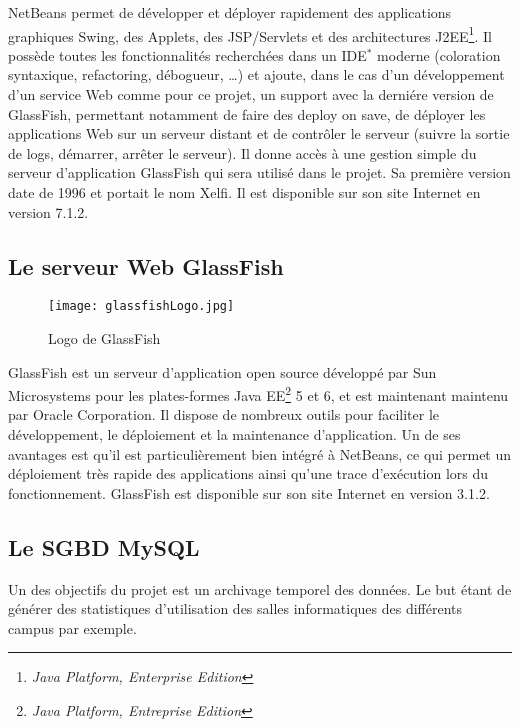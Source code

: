 NetBeans permet de d\'evelopper et d\'eployer rapidement des applications graphiques Swing, des Applets, des JSP/Servlets et des architectures J2EE\protect\footnote{\textit{Java Platform, Enterprise Edition}}.
Il poss\`ede toutes les fonctionnalit\'es recherch\'ees dans un IDE$^*$ moderne (coloration syntaxique, refactoring, d\'ebogueur, \ldots) et ajoute, dans le cas d'un d\'eveloppement d'un service Web comme pour ce projet, un support avec la derni\'ere version de GlassFish, permettant notamment de faire des \og{}deploy on save\fg{}, de d\'eployer les applications Web sur un serveur distant et de contr\^oler le serveur (suivre la sortie de logs, d\'emarrer, arr\^eter le serveur). 
Il donne acc\`es \`a une gestion simple du serveur d'application GlassFish qui sera utilis\'e dans le projet.
Sa premi\`ere version date de 1996 et portait le nom Xelfi. 
Il est disponible sur son site Internet\cite{biblio:siteNetbeans} en version 7.1.2.

\subsection{Le serveur Web GlassFish}

\begin{figure}[!ht]
	\centering
	\texttt{[image: glassfishLogo.jpg]}
	\caption{Logo de GlassFish}

\end{figure}

GlassFish est un serveur d'application open source d\'evelopp\'e par Sun Microsystems pour les plates-formes Java EE\protect\footnote{\textit{Java Platform, Entreprise Edition}} 5 et 6, et est maintenant maintenu par Oracle Corporation.
Il dispose de nombreux outils pour faciliter le d\'eveloppement, le d\'eploiement et la maintenance d'application.
Un de ses avantages est qu'il est particuli\`erement bien int\'egr\'e \`a NetBeans, ce qui permet un d\'eploiement tr\`es rapide des applications ainsi qu'une trace d'ex\'ecution lors du fonctionnement.
GlassFish est disponible sur son site Internet\cite{biblio:siteGlassfish} en version 3.1.2.

\subsection{Le SGBD MySQL}

Un des objectifs du projet {\YuukouII} est un archivage temporel des donn\'ees.
Le but \'etant de g\'en\'erer des statistiques d'utilisation des salles informatiques des diff\'erents campus par exemple.

